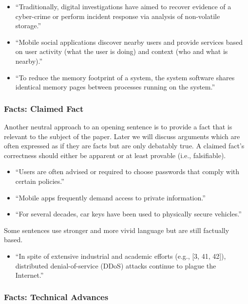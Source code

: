 \documentclass[sigconf]{acmart}
\begin{document}
	\begin{itemize}

		\item	``Traditionally, digital investigations have aimed to recover evidence of a cyber-crime or perform incident response via analysis of non-volatile storage.''~\cite{saltaformaggio2014dscrete}

		\item	``Mobile social applications discover nearby users and provide services based on user activity (what the user is doing) and context (who and what is nearby).''~\cite{lentz2014sddr}

		\item	``To reduce the memory footprint of a system, the system software shares identical memory pages between processes running on the system.''~\cite{yarom2014flush+}
	\end{itemize}
	\subsubsection{Facts: Claimed Fact}

	Another neutral approach to an opening sentence is to provide a fact that is relevant to the subject of the paper. Later we will discuss arguments which are often expressed as if they are facts but are only debatably true. A claimed fact’s correctness should either be apparent or at least provable (i.e., falsifiable).
	\begin{itemize}
		\item	``Users are often advised or required to choose passwords that comply with certain policies.''~\cite{komanduri2014telepathwords}

		\item	``Mobile apps frequently demand access to private information.''~\cite{tripp2014bayesian}

		\item	``For several decades, car keys have been used to physically secure vehicles.''~\cite{garcia2016lock}
	\end{itemize}
	Some sentences use stronger and more vivid language but are still factually based.
	\begin{itemize}
		\item	``In spite of extensive industrial and academic efforts (e.g., [3, 41, 42]), distributed denial-of-service (DDoS) attacks continue to plague the Internet.''~\cite{fayaz2015bohatei}
	\end{itemize}

	\subsubsection{Facts: Technical Advances}
\end{document}
